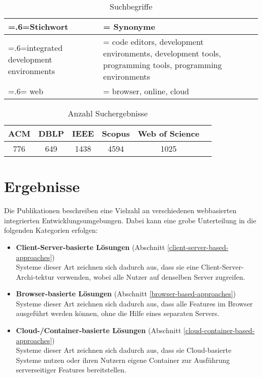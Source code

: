 \begin{table}[tbp]
    \centering
    \begin{tabularx}{\textwidth}{| >{\hsize=.6\hsize\linewidth=\hsize}X |
            >{\hsize=1.4\hsize\linewidth=\hsize}X |}
        \hline
        Stichwort                           & Synonyme                                                                                               \\
        \hline
        integrated development environments & code editors, development environments, development tools, programming tools, programming environments \\
        \hline
        web                                 & browser, online, cloud                                                                                 \\
        \hline
    \end{tabularx}
    \caption{Suchbegriffe}
    \label{table:search-terms}
\end{table}


\begin{table}[tbp]
    \centering
    \begin{tabular}{|c|c|c|c|c|c|}
        \hline
        ACM & DBLP & IEEE & Scopus & Web of Science \\
        \hline
        776 & 649  & 1438 & 4594   & 1025           \\
        \hline
    \end{tabular}
    \caption{Anzahl Suchergebnisse}
    \label{table:amount-search-results}
\end{table}

\section{Ergebnisse}

Die Publikationen beschreiben eine Vielzahl an verschiedenen webbasierten integrierten Entwicklungsumgebungen. Dabei kann eine grobe Unterteilung in die folgenden Kategorien erfolgen:

\begin{itemize}
    \item \textbf{Client-Server-basierte Lösungen} \hfill (Abschnitt \ref{client-server-based-approaches}) \\
          Systeme dieser Art zeichnen sich dadurch aus, dass sie eine Client-Server-Archi-tektur verwenden, wobei alle Nutzer auf denselben Server zugreifen.
    \item \textbf{Browser-basierte Lösungen} \hfill (Abschnitt \ref{browser-based-approaches}) \\
          Systeme dieser Art zeichnen sich dadurch aus, dass alle Features im Browser ausgeführt werden können, ohne die Hilfe eines separaten Servers.
    \item \textbf{Cloud-/Container-basierte Lösungen} \hfill (Abschnitt \ref{cloud-container-based-approaches}) \\
          Systeme dieser Art zeichnen sich dadurch aus, dass sie Cloud-basierte Systeme nutzen oder ihren Nutzern eigene Container zur Ausführung serverseitiger Features bereitstellen.
\end{itemize}

